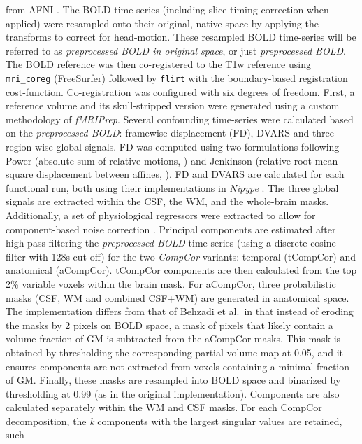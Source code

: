 \documentclass[
]{article}
\begin{document}
\begin{description}
from AFNI \citep[RRID:SCR\_005927]{afni}. The BOLD time-series
(including slice-timing correction when applied) were resampled onto
their original, native space by applying the transforms to correct for
head-motion. These resampled BOLD time-series will be referred to as
\emph{preprocessed BOLD in original space}, or just \emph{preprocessed
BOLD}. The BOLD reference was then co-registered to the T1w reference
using \texttt{mri\_coreg} (FreeSurfer) followed by \texttt{flirt}
\citep[FSL 6.0.5.1:57b01774,][]{flirt} with the boundary-based
registration \citep{bbr} cost-function. Co-registration was configured
with six degrees of freedom. First, a reference volume and its
skull-stripped version were generated using a custom methodology of
\emph{fMRIPrep}. Several confounding time-series were calculated based
on the \emph{preprocessed BOLD}: framewise displacement (FD), DVARS and
three region-wise global signals. FD was computed using two formulations
following Power (absolute sum of relative motions,
\citet{power_fd_dvars}) and Jenkinson (relative root mean square
displacement between affines, \citet{mcflirt}). FD and DVARS are
calculated for each functional run, both using their implementations in
\emph{Nipype} \citep[following the definitions by][]{power_fd_dvars}.
The three global signals are extracted within the CSF, the WM, and the
whole-brain masks. Additionally, a set of physiological regressors were
extracted to allow for component-based noise correction
\citep[\emph{CompCor},][]{compcor}. Principal components are estimated
after high-pass filtering the \emph{preprocessed BOLD} time-series
(using a discrete cosine filter with 128s cut-off) for the two
\emph{CompCor} variants: temporal (tCompCor) and anatomical (aCompCor).
tCompCor components are then calculated from the top 2\% variable voxels
within the brain mask. For aCompCor, three probabilistic masks (CSF, WM
and combined CSF+WM) are generated in anatomical space. The
implementation differs from that of Behzadi et al.~in that instead of
eroding the masks by 2 pixels on BOLD space, a mask of pixels that
likely contain a volume fraction of GM is subtracted from the aCompCor
masks. This mask is obtained by thresholding the corresponding partial
volume map at 0.05, and it ensures components are not extracted from
voxels containing a minimal fraction of GM. Finally, these masks are
resampled into BOLD space and binarized by thresholding at 0.99 (as in
the original implementation). Components are also calculated separately
within the WM and CSF masks. For each CompCor decomposition, the
\emph{k} components with the largest singular values are retained, such

\end{description}
\end{document}

